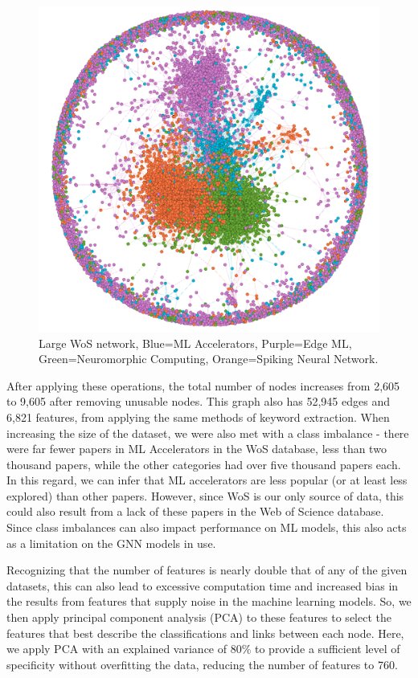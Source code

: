 \documentclass[conference]{IEEEtran}
\begin{document}
\begin{figure}[htbp]
    \centerline{\includegraphics[scale=0.3] {wos_pic.png}}
    \caption{Large WoS network, Blue=ML Accelerators, Purple=Edge ML, Green=Neuromorphic Computing, Orange=Spiking Neural Network.}
    \label{fig}
\end{figure}

After applying these operations, the total number of nodes increases from 2,605 to 9,605 after removing 
unusable nodes. This graph also has 52,945 edges and 6,821 features, from applying the 
same methods of keyword extraction. When increasing the size of the dataset, we were also 
met with a class imbalance - there were far fewer papers in ML Accelerators in the WoS database, 
less than two thousand papers, while the other categories had over five thousand papers each. 
In this regard, we can infer that ML accelerators are less popular (or at least less explored) 
than other papers. However, since WoS is our only source of data, this could also result from 
a lack of these papers in the Web of Science database. Since class imbalances can also impact 
performance on ML models, this also acts as a limitation on the GNN models in use. \par

Recognizing that the number of features is nearly double that of any of the given datasets, 
this can also lead to excessive computation time and increased bias in the results from 
features that supply noise in the machine learning models. So, we then apply principal 
component analysis (PCA) to these features to select the features that best describe the 
classifications and links between each node. Here, we apply PCA with an explained variance 
of 80\% to provide a sufficient level of specificity without overfitting the data, 
reducing the number of features to 760. \par
\end{document}
